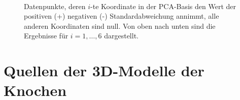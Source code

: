 \begin{figure}
   \\
   \qquad
   
   \caption{Datenpunkte, deren $i$-te Koordinate in der PCA-Basis den Wert der positiven (+) \bzw negativen (-) Standardabweichung annimmt, alle anderen Koordinaten sind null. Von oben nach unten sind die Ergebnisse für $i = 1,\dots ,6$ dargestellt.}
   \label{pca_results_sqrtEV}
  \end{figure}
  
  
\chapter{Quellen der 3D-Modelle der Knochen}
\label{model_sources}

